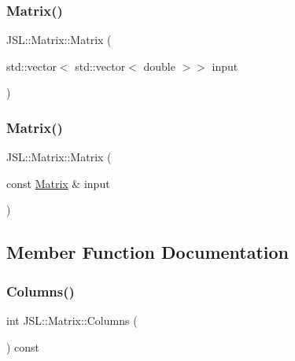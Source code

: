 \subsubsection{\texorpdfstring{Matrix()}{Matrix()}\hspace{0.1cm}{\footnotesize\ttfamily [2/3]}}
{\footnotesize\ttfamily J\+S\+L\+::\+Matrix\+::\+Matrix (\begin{DoxyParamCaption}\item[{std\+::vector$<$ std\+::vector$<$ double $>$$>$}]{input }\end{DoxyParamCaption})\hspace{0.3cm}{\ttfamily [inline]}}

\mbox{\label{classJSL_1_1Matrix_ae6198f4beabaff7700265fffeb490ed7}} 
\subsubsection{\texorpdfstring{Matrix()}{Matrix()}\hspace{0.1cm}{\footnotesize\ttfamily [3/3]}}
{\footnotesize\ttfamily J\+S\+L\+::\+Matrix\+::\+Matrix (\begin{DoxyParamCaption}\item[{const \hyperlink{classJSL_1_1Matrix}{Matrix} \&}]{input }\end{DoxyParamCaption})\hspace{0.3cm}{\ttfamily [inline]}}



\subsection{Member Function Documentation}
\mbox{\label{classJSL_1_1Matrix_a8aba7f9803b553df2aeae68aba3445f5}} 
\subsubsection{\texorpdfstring{Columns()}{Columns()}}
{\footnotesize\ttfamily int J\+S\+L\+::\+Matrix\+::\+Columns (\begin{DoxyParamCaption}{ }\end{DoxyParamCaption}) const\hspace{0.3cm}{\ttfamily [inline]}}

